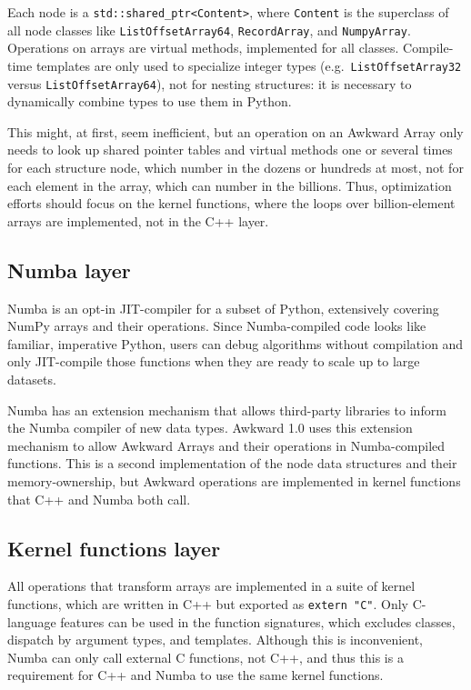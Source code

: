 \documentclass{webofc}
\begin{document}
\noindent Each node is a \texttt{std::shared_ptr<Content>}, where \texttt{Content} is the superclass of all node classes like \texttt{ListOffsetArray64}, \texttt{RecordArray}, and \texttt{NumpyArray}. Operations on arrays are virtual methods, implemented for all classes. Compile-time templates are only used to specialize integer types (e.g.\ \texttt{ListOffsetArray32} versus \texttt{ListOffsetArray64}), not for nesting structures: it is necessary to dynamically combine types to use them in Python.

This might, at first, seem inefficient, but an operation on an Awkward Array only needs to look up shared pointer tables and virtual methods one or several times for each structure node, which number in the dozens or hundreds at most, not for each element in the array, which can number in the billions. Thus, optimization efforts should focus on the kernel functions, where the loops over billion-element arrays are implemented, not in the C++ layer.

\subsection{Numba layer}

Numba is an opt-in JIT-compiler for a subset of Python, extensively covering NumPy arrays and their operations. Since Numba-compiled code looks like familiar, imperative Python, users can debug algorithms without compilation and only JIT-compile those functions when they are ready to scale up to large datasets.

Numba has an extension mechanism that allows third-party libraries to inform the Numba compiler of new data types. Awkward 1.0 uses this extension mechanism to allow Awkward Arrays and their operations in Numba-compiled functions. This is a second implementation of the node data structures and their memory-ownership, but Awkward operations are implemented in kernel functions that C++ and Numba both call.

\subsection{Kernel functions layer}

All operations that transform arrays are implemented in a suite of kernel functions, which are written in C++ but exported as \texttt{extern "C"}. Only C-language features can be used in the function signatures, which excludes classes, dispatch by argument types, and templates. Although this is inconvenient, Numba can only call external C functions, not C++, and thus this is a requirement for C++ and Numba to use the same kernel functions.
\end{document}
